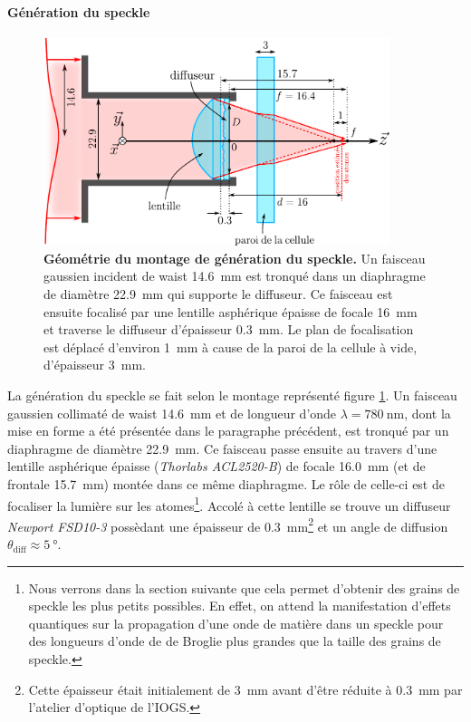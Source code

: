 \paragraph*{Génération du speckle}

\begin{figure}
\centering
\includegraphics[width=0.9\textwidth]{Fig/Speckle/montage_diffuseur.pdf}
\caption{\textbf{Géométrie du montage de génération du speckle.} Un faisceau gaussien incident de waist \SI{14.6}{\milli\metre} est tronqué dans un diaphragme de diamètre \SI{22.9}{\milli\metre} qui supporte le diffuseur. Ce faisceau est ensuite focalisé par une lentille asphérique épaisse de focale \SI{16}{\milli\metre} et traverse le diffuseur d'épaisseur \SI{0.3}{\milli\metre}. Le plan de focalisation est déplacé d'environ \SI{1}{\milli\metre} à cause de la paroi de la cellule à vide, d'épaisseur \SI{3}{\milli\metre}.}
\label{fig:montage_diffuseur}
\end{figure}

La génération du speckle se fait selon le montage représenté figure \ref{fig:montage_diffuseur}. Un faisceau gaussien collimaté de waist \SI{14.6}{\milli\metre} et de longueur d'onde $\lambda=\SI{780}{\nano\metre}$, dont la mise en forme a été présentée dans le paragraphe précédent, est tronqué par un diaphragme de diamètre \SI{22.9}{\milli\metre}. Ce faisceau passe ensuite au travers d'une lentille asphérique épaisse (\textit{Thorlabs ACL2520-B}) de focale \SI{16.0}{\milli\metre} (et de frontale \SI{15.7}{\milli\metre}) montée dans ce même diaphragme. Le rôle de celle-ci est de focaliser la lumière sur les atomes\footnote{Nous verrons dans la section suivante que cela permet d'obtenir des grains de speckle les plus petits possibles. En effet, on attend la manifestation d'effets quantiques sur la propagation d'une onde de matière dans un speckle pour des longueurs d'onde de de Broglie plus grandes que la taille des grains de speckle.}. Accolé à cette lentille se trouve un diffuseur \textit{Newport FSD10-3} possèdant une épaisseur de \SI{0.3}{\milli\metre}\footnote{Cette épaisseur était initialement de \SI{3}{\milli\metre} avant d'être réduite à \SI{0.3}{\milli\metre} par l'atelier d'optique de l'IOGS.} et un angle de diffusion $\theta_{\mathrm{diff}}\approx\SI{5}{\degree}$. 

